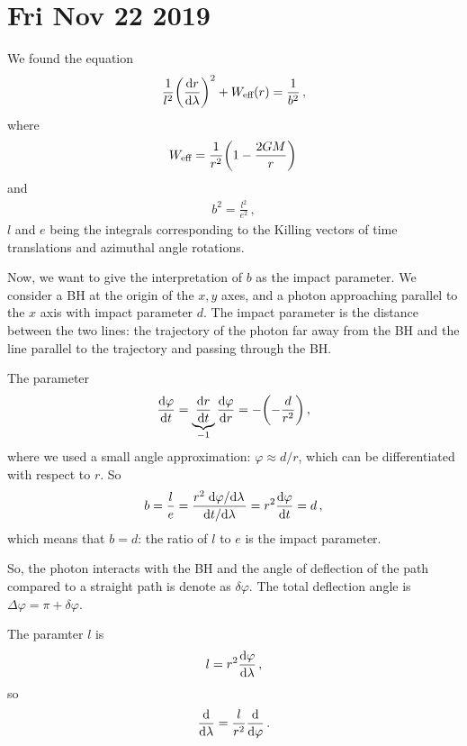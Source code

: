 \documentclass[main.tex]{subfiles}
\begin{document}
\section*{Fri Nov 22 2019}

We found the equation 
%
\begin{align}
  \frac{1}{l^2} \qty(\dv{r}{\lambda })^2 + W _{\text{eff}}(r) = \frac{1}{b^2}
\,,
\end{align}
%
where 
%
\begin{align}
  W _{\text{eff}} = \frac{1}{r^2} \qty(1 - \frac{2GM}{r})
\,
\end{align}
%
and 
%
\begin{align}
  b^2 = \frac{l^2}{e^2}
\,,
\end{align}
%
\(l\) and \(e\) being the integrals corresponding to the Killing vectors of time translations and azimuthal angle rotations. 

Now, we want to give the interpretation of \(b\) as the impact parameter. 
We consider a BH at the origin of the \(x, y\) axes, and a photon approaching parallel to the \(x\) axis with impact parameter \(d\). The impact parameter is the distance between the two lines: the trajectory of the photon far away from the BH and the line parallel to the trajectory and passing through the BH. 

The parameter 
%
\begin{align}
  \dv{\varphi }{t} = \underbrace{\dv{r}{t}}_{-1} \dv{\varphi }{r} = - \qty(-\frac{d}{r^2})
\,,
\end{align}
%
where we used a small angle approximation: \(\varphi \approx d/r\), which can be differentiated with respect to \(r\). 
So 
%
\begin{align}
  b = \frac{l}{e} = \frac{r^2 \dv*{\varphi }{\lambda }}{\dv*{t}{\lambda }} = r^2 \dv{\varphi }{t} = d 
\,,
\end{align}
%
which means that \(b=d\): the ratio of \(l\) to \(e\) is the impact parameter. 

So, the photon interacts with the BH and the angle of deflection of the path compared to a straight path is denote as \(\delta \varphi \). 
The total deflection angle is \(\Delta \varphi  = \pi + \delta \varphi \). 

The paramter \(l\) is 
%
\begin{align}
  l = r^2 \dv{\varphi }{\lambda } 
\,,
\end{align}
%
so 
%
\begin{align}
  \dv{}{\lambda } = \frac{l}{r^2} \dv{}{\varphi }
\,.
\end{align}
\end{document}
